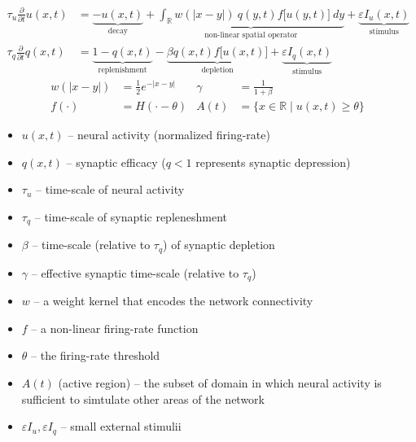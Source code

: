 \documentclass[landscape,final]{baposter}
\newcommand{\RR}{\mathbb{R}}
\begin{document}
\begin{poster}
{
	\begin{align*}
		\tau_u \frac{\partial}{\partial t} u(x, t) &= \underbrace{-u(x,t)}_{\text{decay}} + \underbrace{\int_\RR w(|x-y|) \ q(y, t) f\big[u(y, t)\big] \ dy}_{\text{non-linear spatial operator}} + \underbrace{\varepsilon I_u(x, t)}_{\text{stimulus}}\\
		\tau_q \frac{\partial}{\partial t} q(x, t) &= \underbrace{1 - q(x,t)}_{\text{replenishment}} - \underbrace{\beta q(x,t) f\big[u(x, t)\big]}_{\text{depletion}} + \underbrace{\varepsilon I_q(x,t)}_{\text{stimulus}}
	\end{align*}
	\vspace{-.5cm}
	\begin{align*}
		w(|x-y|) &= \tfrac{1}{2}e^{-|x-y|} & \gamma &= \frac{1}{1+\beta} \\
		f(\cdot) &= H(\cdot - \theta) & A(t) &= \{x \in \RR \mid u(x,t) \ge \theta \}
	\end{align*}
	\begin{itemize}
		\item $u(x,t)$ -- neural activity (normalized firing-rate)
		\item $q(x,t)$ -- synaptic efficacy ($q<1$ represents synaptic depression)
		\item $\tau_u$ -- time-scale of neural activity
		\item $\tau_q$ -- time-scale of synaptic repleneshment
		\item $\beta$ -- time-scale (relative to $\tau_q$) of synaptic depletion
		\item $\gamma$ -- effective synaptic time-scale (relative to $\tau_q$)
		\item $w$ -- a weight kernel that encodes the network connectivity
		\item $f$ -- a non-linear firing-rate function
		\item $\theta$ -- the firing-rate threshold
		\item $A(t)$ (active region) -- the subset of domain in which neural activity is sufficient to simtulate other areas of the network
		\item $\varepsilon I_u, \varepsilon I_q$ -- small external stimulii
	\end{itemize}
	
}
\end{poster}
\end{document}
